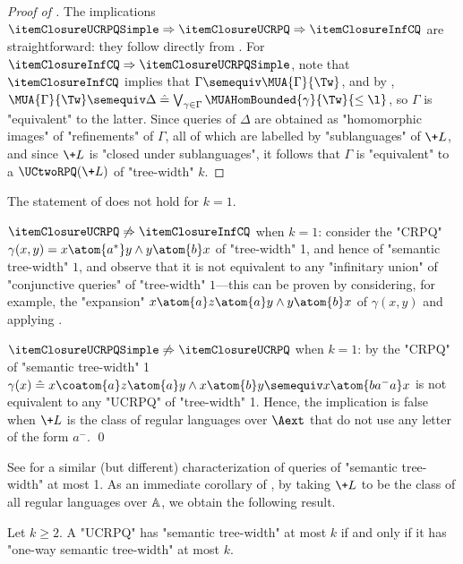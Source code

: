 \begin{proof}[Proof of ]
    The implications
	$\itemClosureUCRPQSimple \Rightarrow \itemClosureUCRPQ \Rightarrow \itemClosureInfCQ$
	are straightforward:
    they follow directly from .
    For $\itemClosureInfCQ \Rightarrow \itemClosureUCRPQSimple$, note that $\itemClosureInfCQ$ implies that
    $\Gamma \semequiv \MUA{\Gamma}{\Tw}$, and by
    ,
    $\MUA{\Gamma}{\Tw} \semequiv \Delta \defeq
    \bigvee_{\gamma \in \Gamma} \MUAHomBounded{\gamma}{\Tw}{\leq \l}$,
    so $\Gamma$ is "equivalent" to the latter.
    Since queries of $\Delta$ are obtained as "homomorphic images"
    of "refinements" of $\Gamma$, all of which are labelled by "sublanguages" of
    $\+L$, and since $\+L$ is "closed under sublanguages", it follows that
    $\Gamma$ is "equivalent" to a $\UCtwoRPQ(\+L)$ of "tree-width" $k$.
\end{proof}

\begin{remark}
    \AP\label{rk:closure-under-sublanguages-k1}
	The statement of  does not hold for $k=1$.

    $\itemClosureUCRPQ \not\Rightarrow \itemClosureInfCQ$ when $k=1$:
    consider the "CRPQ" $\gamma(x,y) = x \atom{a^*} y \land y \atom{b} x$ of "tree-width" 1,
    and hence of "semantic tree-width" $1$, and observe that it is not equivalent to any
    "infinitary union" of "conjunctive queries" of "tree-width" $1$---this can be proven
    by considering, for example, the "expansion"
    $x \atom{a} z \atom{a} y \land y \atom{b} x$ of $\gamma(x,y)$
    and applying .

    $\itemClosureUCRPQSimple \not\Rightarrow \itemClosureUCRPQ$ when $k=1$:
	by \cite[Proposition 6.4]{BarceloRomeroVardi2016SemanticAcyclicity} the "CRPQ"
    of "semantic tree-width" 1
    $\gamma(x) \defeq x \coatom{a} z \atom{a} y \land x \atom{b} y \semequiv x \atom{ba^- a} x$
    is not equivalent to any "UCRPQ" of "tree-width" 1. Hence, the implication is false when $\+L$ is the class of regular languages over $\Aext$
    that do not use any letter of the form $a^-$. \qed
\end{remark}

See  for a similar (but different) characterization
of queries of "semantic tree-width" at most 1.
As an immediate corollary of , by taking
$\+L$ to be the class of all regular languages over $\mathbb{A}$, we obtain the following result.
\begin{corollary}
	\AP\label{coro:collapse-twoway-oneway-semtw}
	Let $k \geq 2$. A "UCRPQ" has "semantic tree-width" at most $k$
	if and only if it has "one-way semantic tree-width" at most $k$.
\end{corollary}

